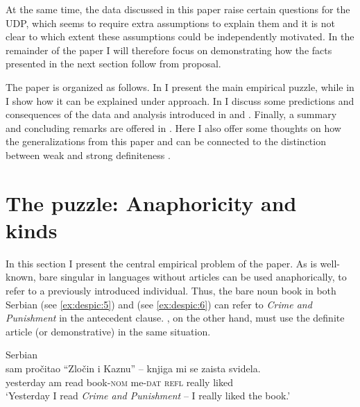 \documentclass[output=paper,
modfonts
]{langscibook}
\begin{document}
	At the same time, the data discussed in this paper raise certain questions for the UDP, which seems to require extra assumptions to explain them and it is not clear to which extent these assumptions could be independently motivated. In the remainder of the paper I will therefore focus on demonstrating how the facts presented in the next section follow from  proposal. 
	
	The paper is organized as follows. In  I present the main empirical puzzle, while in  I show how it can be explained under  approach. In  I discuss some predictions and consequences of the data and analysis introduced in  and . Finally, a summary and concluding remarks are offered in .
	Here I also offer some thoughts on how the generalizations from this paper and \citep{Dayal2004} can be connected to the distinction between weak and strong definiteness \citep[e.g.][]{Schwarz2009}. 
	
	\section{The puzzle: Anaphoricity and kinds } \label{sec:despic:2}
	
	In this section I present the central empirical problem of the paper. As is well-known, bare singular  in languages without articles can be used anaphorically, to refer to a previously introduced individual. Thus, the bare noun book in both Serbian (see \ref{ex:despic:5}) and  (see \ref{ex:despic:6}) can refer to \textit{Crime and Punishment} in the antecedent clause. , on the other hand, must use the definite article (or demonstrative) in the same situation. 
	
	\ea \label{ex:despic:5}
	Serbian \\
	  {sam} {pro\v citao} {``Zlo\v cin   i      Kaznu''} --     {knjiga}       {mi}        {se} {zaista} {svidela}. \\
	yesterday am   read  \phantom{``}{Crime and Punishment}  {} book-\textsc{nom} me-\textsc{dat} \textsc{refl} really liked\\ 
	\glt `Yesterday I read \textit{Crime and Punishment} -- I really liked the book.'
	\z 
	
\end{document}
